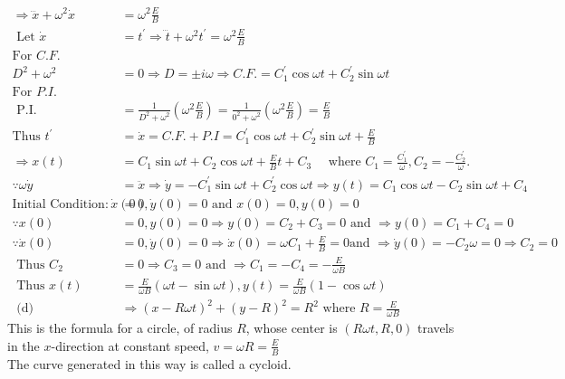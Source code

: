 \begin{enumerate}
\begin{answer}
\begin{align*}
\Rightarrow \dddot x+\omega^{2} \dot{x}&=\omega^{2} \frac{E}{B} \\
\text { Let } \dot{x}&=t^{\prime} \Rightarrow \dddot t+\omega^{2} t^{\prime}=\omega^{2} \frac{E}{B}\\
\text{For $C . F$.}&\\
D^{2}+\omega^{2}&=0 \Rightarrow D=\pm i \omega \Rightarrow C . F .=C_{1}^{\prime} \cos \omega t+C_{2}^{\prime} \sin \omega t\\
\text{For $P . I$.}&\\
\text { P.I. }&=\frac{1}{D^{2}+\omega^{2}}\left(\omega^{2} \frac{E}{B}\right)=\frac{1}{0^{2}+\omega^{2}}\left(\omega^{2} \frac{E}{B}\right)=\frac{E}{B}\\
\text{Thus }t^{\prime}&=\dot{x}=C . F .+P . I=C_{1}^{\prime} \cos \omega t+C_{2}^{\prime} \sin \omega t+\frac{E}{B}\\
\Rightarrow x(t)&=C_{1} \sin \omega t+C_{2} \cos \omega t+\frac{E}{B} t+C_{3} \quad \text{ where }C_{1}=\frac{C_{1}^{\prime}}{\omega}, C_{2}=-\frac{C_{2}^{\prime}}{\omega} .\\ \because \omega \dot{y}&=\ddot{x} \Rightarrow \dot{y}=-C_{1}^{\prime} \sin \omega t+C_{2}^{\prime} \cos \omega t \Rightarrow y(t)=C_{1} \cos \omega t-C_{2} \sin \omega t+C_{4}\\
\text{Initial Condition: }\dot{x}(0)&=0, \dot{y}(0)=0\text{ and }x(0)=0, y(0)=0\\ \because x(0)&=0, y(0)=0 \Rightarrow y(0)=C_{2}+C_{3}=0\text{ and }\Rightarrow y(0)=C_{1}+C_{4}=0\\
 \because \dot{x}(0)&=0, \dot{y}(0)=0 \Rightarrow \dot{x}(0)=\omega C_{1}+\frac{E}{B}=0 \text{and }\Rightarrow \dot{y}(0)=-C_{2} \omega=0 \Rightarrow C_{2}=0\\
\text{ Thus }C_{2}&=0 \Rightarrow C_{3}=0\text{ and }\Rightarrow C_{1}=-C_{4}=-\frac{E}{\omega B}\\
\text{ Thus }x(t)&=\frac{E}{\omega B}(\omega t-\sin \omega t), y(t)=\frac{E}{\omega B}(1-\cos \omega t)\\
\text{ (d) }&\Rightarrow(x-R \omega t)^{2}+(y-R)^{2}=R^{2}\text{ where }R=\frac{E}{\omega B}
	\end{align*}
	 This is the formula for a circle, of radius $R$, whose center is $(R \omega t, R, 0)$ travels in the $x$-direction at constant speed, $v=\omega R=\frac{E}{B}$\\
	The curve generated in this way is called a cycloid.
\end{answer}








\end{enumerate}